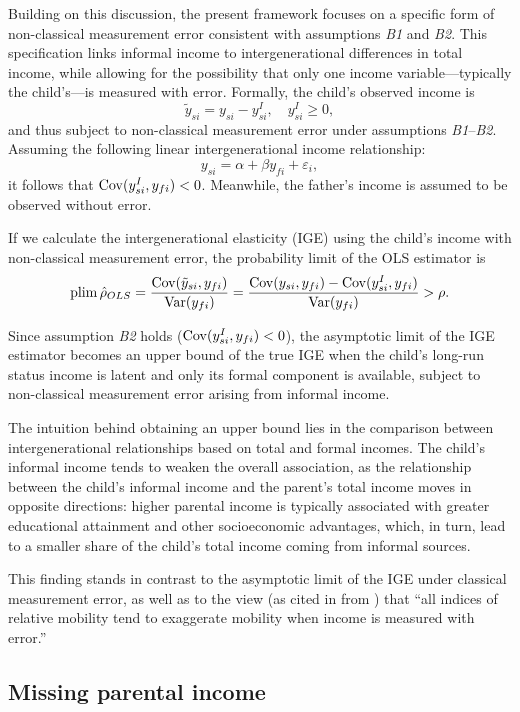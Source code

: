 Building on this discussion, the present framework focuses on a specific form of non-classical measurement error consistent with assumptions \emph{B1} and \emph{B2}.  
This specification links informal income to intergenerational differences in total income, while allowing for the possibility that only one income variable—typically the child’s—is measured with error.  
Formally, the child’s observed income is
\[
\tilde y_{si} = y_{si} - y_{si}^I, \quad y_{si}^I \ge 0,
\]
and thus subject to non-classical measurement error under assumptions \emph{B1}–\emph{B2}.  
Assuming the following linear intergenerational income relationship:
\[
y_{si} = \alpha + \beta y_{fi} + \varepsilon_i,
\]
it follows that $\operatorname{Cov}(y^I_{si}, y_{fi}) < 0$.  
Meanwhile, the father’s income is assumed to be observed without error.


If we calculate the intergenerational elasticity (IGE) using the child’s income with non-classical measurement error, the probability limit of the OLS estimator is
\[
\operatorname*{plim} \hat{\rho}_{OLS} = \frac{\operatorname{Cov}(\tilde{y}_{si}, y_{fi})}{\operatorname{Var}(y_{fi})} = \frac{\operatorname{Cov}(y_{si},y_{fi}) - \operatorname{Cov}(y^I_{si},y_{fi})}{\operatorname{Var}(y_{fi})} > \rho.
\]

Since assumption \emph{B2} holds ($\operatorname{Cov}(y^I_{si}, y_{fi}) < 0$), the asymptotic limit of the IGE estimator becomes an upper bound of the true IGE when the child’s long-run status income is latent and only its formal component is available, subject to non-classical measurement error arising from informal income.

The intuition behind obtaining an upper bound lies in the comparison between intergenerational relationships based on total and formal incomes. The child’s informal income tends to weaken the overall association, as the relationship between the child’s informal income and the parent’s total income moves in opposite directions: higher parental income is typically associated with greater educational attainment and other socioeconomic advantages, which, in turn, lead to a smaller share of the child’s total income coming from informal sources. 


This finding stands in contrast to the asymptotic limit of the IGE under classical measurement error, as well as to the view (as cited in \textcite{Millimet_2019} from \textcite{Glewwe_2011}) that “all indices of relative mobility tend to exaggerate mobility when income is measured with error.”


\subsection{Missing parental income}

